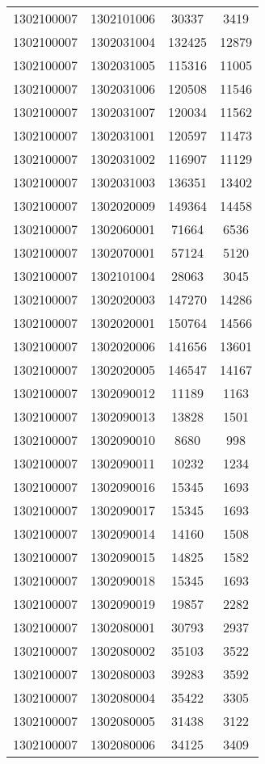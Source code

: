 \begin{longtable}{llcc}
1302100007 & 1302101006 & 30337 & 3419\\
1302100007 & 1302031004 & 132425 & 12879\\
1302100007 & 1302031005 & 115316 & 11005\\
1302100007 & 1302031006 & 120508 & 11546\\
1302100007 & 1302031007 & 120034 & 11562\\
1302100007 & 1302031001 & 120597 & 11473\\
1302100007 & 1302031002 & 116907 & 11129\\
1302100007 & 1302031003 & 136351 & 13402\\
1302100007 & 1302020009 & 149364 & 14458\\
1302100007 & 1302060001 & 71664 & 6536\\
1302100007 & 1302070001 & 57124 & 5120\\
1302100007 & 1302101004 & 28063 & 3045\\
1302100007 & 1302020003 & 147270 & 14286\\
1302100007 & 1302020001 & 150764 & 14566\\
1302100007 & 1302020006 & 141656 & 13601\\
1302100007 & 1302020005 & 146547 & 14167\\
1302100007 & 1302090012 & 11189 & 1163\\
1302100007 & 1302090013 & 13828 & 1501\\
1302100007 & 1302090010 & 8680 & 998\\
1302100007 & 1302090011 & 10232 & 1234\\
1302100007 & 1302090016 & 15345 & 1693\\
1302100007 & 1302090017 & 15345 & 1693\\
1302100007 & 1302090014 & 14160 & 1508\\
1302100007 & 1302090015 & 14825 & 1582\\
1302100007 & 1302090018 & 15345 & 1693\\
1302100007 & 1302090019 & 19857 & 2282\\
1302100007 & 1302080001 & 30793 & 2937\\
1302100007 & 1302080002 & 35103 & 3522\\
1302100007 & 1302080003 & 39283 & 3592\\
1302100007 & 1302080004 & 35422 & 3305\\
1302100007 & 1302080005 & 31438 & 3122\\
1302100007 & 1302080006 & 34125 & 3409\\

\end{longtable}
